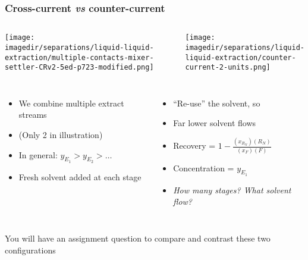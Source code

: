 \begin{frame}\frametitle{Cross-current \emph{vs} counter-current}
	\begin{columns}[t]
			{\color{myGreen}{Cross-current ($N=2$ stages)}} 
			{\color{myGreen}{Counter-current ($N=2$ stages)}}
	\end{columns}
	\begin{columns}[t]
			\begin{center}
				\texttt{[image: \\imagedir/separations/liquid-liquid-extraction/multiple-contacts-mixer-settler-CRv2-5ed-p723-modified.png]}
			\end{center}
			\vspace{-12pt}
			\begin{center}
				\texttt{[image: \\imagedir/separations/liquid-liquid-extraction/counter-current-2-units.png]}
			\end{center}
	\end{columns}
	
	\begin{columns}[t]
			\begin{itemize}
				\item	We combine multiple extract streams
				\item	(Only 2 in illustration)
				\item	In general: $y_{E_1} > y_{E_2} > \ldots$
				\item	Fresh solvent added at each stage
			\end{itemize}
			\begin{itemize}
				\item	``Re-use'' the solvent, so
				\item	Far lower solvent flows
				\item	Recovery = 	\(1 - \displaystyle\frac{(x_{R_N})(R_N)}{(x_F) (F)}\)
				\item	Concentration = \(\displaystyle  y_{E_1}\)
				\item	{\color{brown}\emph{How many stages? What solvent flow?}}
			\end{itemize}
	\end{columns}	
	\vspace{6pt}
	You will have an assignment question to compare and contrast these two configurations
\end{frame}

